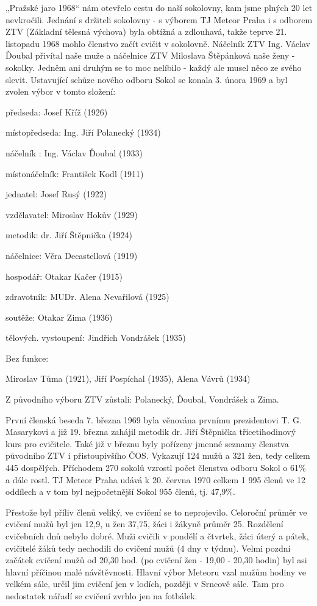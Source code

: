 „Pražské jaro 1968`` nám otevřelo cestu do naší sokolovny, kam jsme
plných 20 let nevkročili. Jednání s držiteli sokolovny - s výborem TJ
Meteor Praha i s odborem ZTV (Základní tělesná výchova) byla obtížná a
zdlouhavá, takže teprve 21. listopadu 1968 mohlo členstvo začít cvičit v
sokolovně. Náčelník ZTV Ing. Václav Ďoubal přivítal naše muže a
náčelnice ZTV Miloslava Štěpánková naše ženy - sokolky. Jedněm ani
druhým se to moc nelíbilo - každý ale musel něco ze svého slevit.
Ustavující schůze nového odboru Sokol se konala 3. února 1969 a byl
zvolen výbor v tomto složení:

předseda: Josef Kříž (1926)

místopředseda: Ing. Jiří Polanecký (1934)

náčelník : Ing. Václav Ďoubal (1933)

místonáčelník: František Kodl (1911)

jednatel: Josef Rusý (1922)

vzdělavatel: Miroslav Hokův (1929)

metodik: dr. Jiří Štěpnička (1924)

náčelnice: Věra Decastellová (1919)

hospodář: Otakar Kačer (1915)

zdravotník: MUDr. Alena Nevařilová (1925)

soutěže: Otakar Zima (1936)

tělových. vystoupení: Jindřich Vondrášek (1935)

Bez funkce:

Miroslav Tůma (1921), Jiří Pospíchal (1935), Alena Vávrů (1934)

Z původního výboru ZTV zůstali: Polanecký, Ďoubal, Vondrášek a Zima.

První členská beseda 7. března 1969 byla věnována prvnímu prezidentovi
T. G. Masarykovi a již 19. března zahájil metodik dr. Jiří Štěpnička
třicetihodinový kurs pro cvičitele. Také již v březnu byly pořízeny
jmenné seznamy členstva původního ZTV i přistoupivšího ČOS. Vykazují 124
mužů a 321 žen, tedy celkem 445 dospělých. Příchodem 270 sokolů vzrostl
počet členstva odboru Sokol o 61\% a dále rostl. TJ Meteor Praha udává k
20. června 1970 celkem 1 995 členů ve 12 oddílech a v tom byl
nejpočetnější Sokol 955 členů, tj. 47,9\%.

Přestože byl příliv členů veliký, ve cvičení se to neprojevilo.
Celoroční průměr ve cvičení mužů byl jen 12,9, u žen 37,75, žáci i
žákyně průměr 25. Rozdělení cvičebních dnů nebylo dobré. Muži cvičili v
pondělí a čtvrtek, žáci úterý a pátek, cvičitelé žáků tedy nechodili do
cvičení mužů (4 dny v týdnu). Velmi pozdní začátek cvičení mužů od 20,30
hod. (po cvičení žen - 19,00 - 20,30 hodin) byl asi hlavní příčinou malé
návštěvnosti. Hlavní výbor Meteoru vzal mužům hodiny ve velkém sále,
určil jim cvičení jen v lodích, později v Srncově sále. Tam pro
nedostatek nářadí se cvičení zvrhlo jen na fotbálek.


